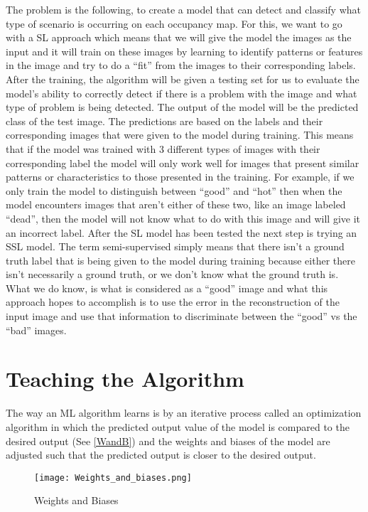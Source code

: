 The problem is the following, to create a model that can detect and classify what type of scenario is occurring on each occupancy map. For this, we want to go with a SL approach which means that we will give the model the images as the input and it will train on these images by learning to identify patterns or features in the image and try to do a “fit” from the images to their corresponding labels. After the training, the algorithm will be given a testing set for us to evaluate the model’s ability to correctly detect if there is a problem with the image and what type of problem is being detected. The output of the model will be the predicted class of the test image. The predictions are based on the labels and their corresponding images that were given to the model during training. This means that if the model was trained with 3 different types of images with their corresponding label the model will only work well for images that present similar patterns or characteristics to those presented in the training. For example, if we only train the model to distinguish between “good” and “hot” then when the model encounters images that aren’t either of these two, like an image labeled “dead”, then the model will not know what to do with this image and will give it an incorrect label.
After the SL model has been tested the next step is trying an SSL model. The term semi-supervised simply means that there isn’t a ground truth label that is being given to the model during training because either there isn’t necessarily a ground truth, or we don’t know what the ground truth is. What we do know, is what is considered as a “good” image and what this approach hopes to accomplish is to use the error in the reconstruction of the input image and use that information to discriminate between the “good” vs the “bad” images.

\section{Teaching the Algorithm}

The way an ML algorithm learns is by an iterative process called an optimization algorithm in which the predicted output value of the model is compared to the desired output (See \autoref{WandB}) and the weights and biases of the model are adjusted such that the predicted output is closer to the desired output.

\begin{figure}[th]
\centering
\texttt{[image: Weights\_and\_biases.png]}
\caption{Weights and Biases \label{WandB}}
\end{figure}

